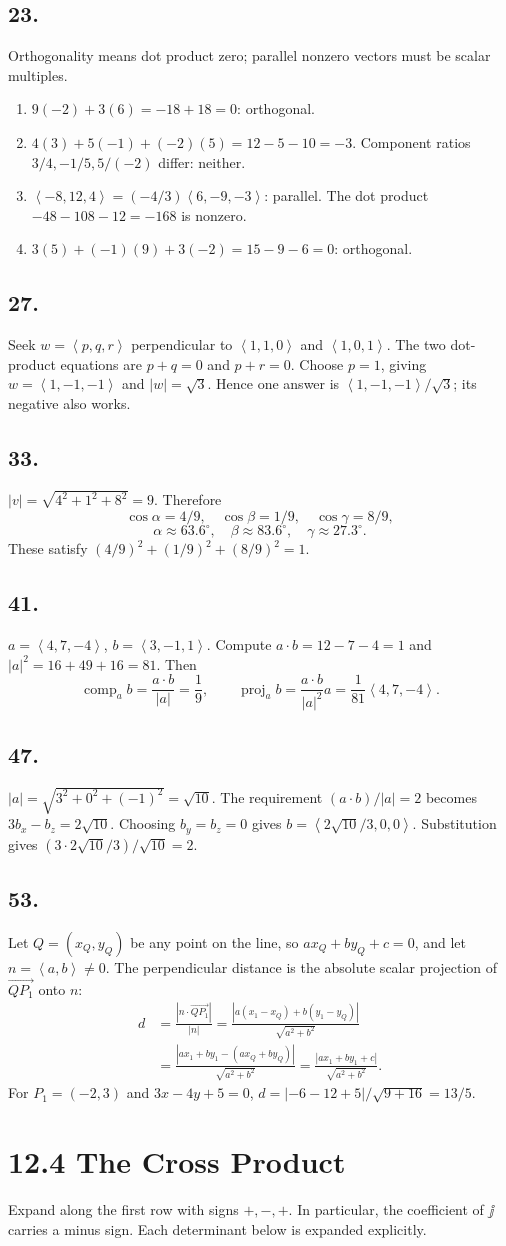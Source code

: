 \documentclass[11pt]{article}
\newcommand{\ex}[1]{\subsection*{#1.}}
\newcommand{\ans}[1]{\boxed{#1}}
\newcommand{\vv}[1]{\left\langle #1\right\rangle}
\begin{document}
\ex{23}
Orthogonality means dot product zero; parallel nonzero vectors must be scalar multiples.
\begin{enumerate}[label=(\alph*)]
\item $9(-2)+3(6)=-18+18=0$: orthogonal.
\item $4(3)+5(-1)+(-2)(5)=12-5-10=-3$. Component ratios $3/4,-1/5,5/(-2)$ differ: neither.
\item $\vv{-8,12,4}=(-4/3)\vv{6,-9,-3}$: parallel. The dot product $-48-108-12=-168$ is nonzero.
\item $3(5)+(-1)(9)+3(-2)=15-9-6=0$: orthogonal.
\end{enumerate}
\ex{27}
Seek $w=\vv{p,q,r}$ perpendicular to $\vv{1,1,0}$ and $\vv{1,0,1}$. The two dot-product equations are $p+q=0$ and $p+r=0$. Choose $p=1$, giving $w=\vv{1,-1,-1}$ and $|w|=\sqrt3$. Hence one answer is $\ans{\vv{1,-1,-1}/\sqrt3}$; its negative also works.
\ex{33}
$|v|=\sqrt{4^2+1^2+8^2}=9$. Therefore
\[\ans{\cos\alpha=4/9,\quad\cos\beta=1/9,\quad\cos\gamma=8/9},\]
\[\ans{\alpha\approx63.6^\circ,\quad\beta\approx83.6^\circ,\quad\gamma\approx27.3^\circ}.\]
These satisfy $(4/9)^2+(1/9)^2+(8/9)^2=1$.
\ex{41}
$a=\vv{4,7,-4}$, $b=\vv{3,-1,1}$. Compute $a\cdot b=12-7-4=1$ and $|a|^2=16+49+16=81$. Then
\[\ans{\operatorname{comp}_a b=\frac{a\cdot b}{|a|}=\frac19},\qquad
\ans{\operatorname{proj}_a b=\frac{a\cdot b}{|a|^2}a=\frac1{81}\vv{4,7,-4}}.\]
\ex{47}
$|a|=\sqrt{3^2+0^2+(-1)^2}=\sqrt{10}$. The requirement $(a\cdot b)/|a|=2$ becomes $3b_x-b_z=2\sqrt{10}$. Choosing $b_y=b_z=0$ gives $\ans{b=\vv{2\sqrt{10}/3,0,0}}$. Substitution gives $(3\cdot2\sqrt{10}/3)/\sqrt{10}=2$.
\ex{53}
Let $Q=(x_Q,y_Q)$ be any point on the line, so $ax_Q+by_Q+c=0$, and let $n=\vv{a,b}\ne0$. The perpendicular distance is the absolute scalar projection of $\overrightarrow{QP_1}$ onto $n$:
\begin{align*}d&=\frac{|n\cdot\overrightarrow{QP_1}|}{|n|}
=\frac{|a(x_1-x_Q)+b(y_1-y_Q)|}{\sqrt{a^2+b^2}}\\
&=\frac{|ax_1+by_1-(ax_Q+by_Q)|}{\sqrt{a^2+b^2}}
=\ans{\frac{|ax_1+by_1+c|}{\sqrt{a^2+b^2}}}.
\end{align*}
For $P_1=(-2,3)$ and $3x-4y+5=0$, $d=|-6-12+5|/\sqrt{9+16}=\ans{13/5}$.
\clearpage\section*{12.4 The Cross Product}
Expand along the first row with signs $+,-,+$. In particular, the coefficient of $\jj$ carries a minus sign. Each determinant below is expanded explicitly.
\end{document}
